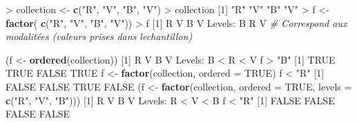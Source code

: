 \documentclass[
]{article}
\newenvironment{Shaded}{}{}
\newcommand{\CommentTok}[1]{\textcolor[rgb]{0.38,0.63,0.69}{\textit{#1}}}
\newcommand{\DataTypeTok}[1]{\textcolor[rgb]{0.56,0.13,0.00}{#1}}
\newcommand{\DecValTok}[1]{\textcolor[rgb]{0.25,0.63,0.44}{#1}}
\newcommand{\KeywordTok}[1]{\textcolor[rgb]{0.00,0.44,0.13}{\textbf{#1}}}
\newcommand{\NormalTok}[1]{#1}
\newcommand{\OperatorTok}[1]{\textcolor[rgb]{0.40,0.40,0.40}{#1}}
\newcommand{\OtherTok}[1]{\textcolor[rgb]{0.00,0.44,0.13}{#1}}
\newcommand{\StringTok}[1]{\textcolor[rgb]{0.25,0.44,0.63}{#1}}
\begin{document}
\begin{Shaded}
\begin{Highlighting}[]
\OperatorTok{\textgreater{}}\StringTok{ }\NormalTok{collection \textless{}{-}}\StringTok{ }\KeywordTok{c}\NormalTok{(}\StringTok{"R"}\NormalTok{, }\StringTok{"V"}\NormalTok{, }\StringTok{"B"}\NormalTok{, }\StringTok{"V"}\NormalTok{)}
\OperatorTok{\textgreater{}}\StringTok{ }\NormalTok{collection}
\NormalTok{[}\DecValTok{1}\NormalTok{] }\StringTok{"R"} \StringTok{"V"} \StringTok{"B"} \StringTok{"V"}
\OperatorTok{\textgreater{}}\StringTok{ }\NormalTok{f \textless{}{-}}\StringTok{ }\KeywordTok{factor}\NormalTok{( }\KeywordTok{c}\NormalTok{(}\StringTok{"R"}\NormalTok{, }\StringTok{"V"}\NormalTok{, }\StringTok{"B"}\NormalTok{, }\StringTok{"V"}\NormalTok{))}
\OperatorTok{\textgreater{}}\StringTok{ }\NormalTok{f}
\NormalTok{[}\DecValTok{1}\NormalTok{] R V B V}
\NormalTok{Levels}\OperatorTok{:}\StringTok{ }\NormalTok{B R V }\CommentTok{\# Correspond aux modalitées (valeurs prises dans l\textquotesingle{}echantillon)}

\NormalTok{(f \textless{}{-}}\StringTok{ }\KeywordTok{ordered}\NormalTok{(collection))}
\NormalTok{[}\DecValTok{1}\NormalTok{] R V B V}
\NormalTok{Levels}\OperatorTok{:}\StringTok{ }\NormalTok{B }\OperatorTok{\textless{}}\StringTok{ }\NormalTok{R }\OperatorTok{\textless{}}\StringTok{ }\NormalTok{V}
\NormalTok{f }\OperatorTok{\textgreater{}}\StringTok{ "B"}
\NormalTok{[}\DecValTok{1}\NormalTok{] }\OtherTok{TRUE} \OtherTok{TRUE} \OtherTok{FALSE} \OtherTok{TRUE}
\NormalTok{f \textless{}{-}}\StringTok{ }\KeywordTok{factor}\NormalTok{(collection, }\DataTypeTok{ordered =} \OtherTok{TRUE}\NormalTok{)}
\NormalTok{f }\OperatorTok{\textless{}}\StringTok{ "R"}
\NormalTok{[}\DecValTok{1}\NormalTok{] }\OtherTok{FALSE} \OtherTok{FALSE} \OtherTok{TRUE} \OtherTok{FALSE}
\NormalTok{(f \textless{}{-}}\StringTok{ }\KeywordTok{factor}\NormalTok{(collection, }\DataTypeTok{ordered =} \OtherTok{TRUE}\NormalTok{, }\DataTypeTok{levels =} \KeywordTok{c}\NormalTok{(}\StringTok{"R"}\NormalTok{, }\StringTok{"V"}\NormalTok{, }\StringTok{"B"}\NormalTok{)))}
\NormalTok{[}\DecValTok{1}\NormalTok{] R V B V}
\NormalTok{Levels}\OperatorTok{:}\StringTok{ }\NormalTok{R }\OperatorTok{\textless{}}\StringTok{ }\NormalTok{V }\OperatorTok{\textless{}}\StringTok{ }\NormalTok{B}
\NormalTok{f }\OperatorTok{\textless{}}\StringTok{ "R"}
\NormalTok{[}\DecValTok{1}\NormalTok{] }\OtherTok{FALSE} \OtherTok{FALSE} \OtherTok{FALSE} \OtherTok{FALSE}
\end{Highlighting}
\end{Shaded}
\end{document}
